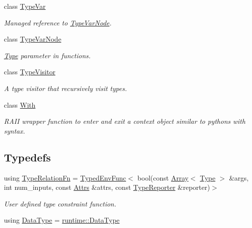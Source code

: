 \begin{DoxyCompactItemize}
class \hyperlink{classtvm_1_1TypeVar}{Type\+Var}
\begin{DoxyCompactList}\small\item\em Managed reference to \hyperlink{classtvm_1_1TypeVarNode}{Type\+Var\+Node}. \end{DoxyCompactList}\item 
class \hyperlink{classtvm_1_1TypeVarNode}{Type\+Var\+Node}
\begin{DoxyCompactList}\small\item\em \hyperlink{classtvm_1_1Type}{Type} parameter in functions. \end{DoxyCompactList}\item 
class \hyperlink{classtvm_1_1TypeVisitor}{Type\+Visitor}
\begin{DoxyCompactList}\small\item\em A type visitor that recursively visit types. \end{DoxyCompactList}\item 
class \hyperlink{classtvm_1_1With}{With}
\begin{DoxyCompactList}\small\item\em R\+A\+II wrapper function to enter and exit a context object similar to python\textquotesingle{}s with syntax. \end{DoxyCompactList}\end{DoxyCompactItemize}
\subsection*{Typedefs}
\begin{DoxyCompactItemize}
\item 
using \hyperlink{namespacetvm_a72dcba4493adfcd8908663898ece3514}{Type\+Relation\+Fn} = \hyperlink{classtvm_1_1TypedEnvFunc}{Typed\+Env\+Func}$<$ bool(const \hyperlink{classtvm_1_1Array}{Array}$<$ \hyperlink{classtvm_1_1Type}{Type} $>$ \&args, int num\+\_\+inputs, const \hyperlink{classtvm_1_1Attrs}{Attrs} \&attrs, const \hyperlink{classtvm_1_1TypeReporter}{Type\+Reporter} \&reporter)$>$
\begin{DoxyCompactList}\small\item\em User defined type constraint function. \end{DoxyCompactList}\item 
using \hyperlink{namespacetvm_a41918af1a1dc386388639a9d3ad06c5d}{Data\+Type} = \hyperlink{classtvm_1_1runtime_1_1DataType}{runtime\+::\+Data\+Type}
\end{DoxyCompactItemize}

